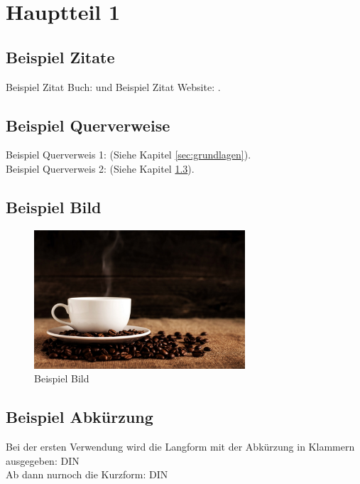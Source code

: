\section{Hauptteil 1}\label{sec:hauptteil1}

\subsection{Beispiel Zitate}\label{subsec:beispielZitate}

Beispiel Zitat Buch: \cite[S. 25-26]{bspBuch2009} und Beispiel Zitat Website: \cite{bspWebsite2014}.


\subsection{Beispiel Querverweise}\label{subsec:beispielQuerverweise}

Beispiel Querverweis 1: (Siehe Kapitel \ref{sec:grundlagen}). \\

Beispiel Querverweis 2: (Siehe Kapitel \ref{subsec:beispielBild}). 


\subsection{Beispiel Bild}\label{subsec:beispielBild}

\begin{figure}[htbp] 
  \centering
     \includegraphics[width=0.7\textwidth]{resources/img/example_picture.jpg}
  \caption{Beispiel Bild}
  \label{fig:Bild1}
\end{figure}


\subsection{Beispiel Abkürzung}\label{subsec:beispielAbkuerzung}

Bei der ersten Verwendung wird die Langform mit der Abkürzung in Klammern ausgegeben: \ac{DIN} \\

Ab dann nurnoch die Kurzform:  \ac{DIN} 